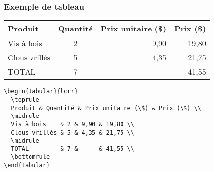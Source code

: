 \begin{frame}[fragile=singleslide]
  \frametitle{Exemple de tableau}

  \begin{center}
    \begin{tabular}{lcrr}
      \toprule
      Produit & Quantité & Prix unitaire (\$) & Prix (\$) \\
      \midrule
      Vis à bois    & 2 & 9,90 & 19,80 \\
      Clous vrillés & 5 & 4,35 & 21,75 \\
      \midrule
      TOTAL         & 7 &      & 41,55 \\
      \bottomrule
    \end{tabular}
  \end{center}

\begin{lstlisting}
\begin{tabular}{lcrr}
  \toprule
  Produit & Quantité & Prix unitaire (\$) & Prix (\$) \\
  \midrule
  Vis à bois    & 2 & 9,90 & 19,80 \\
  Clous vrillés & 5 & 4,35 & 21,75 \\
  \midrule
  TOTAL         & 7 &      & 41,55 \\
  \bottomrule
\end{tabular}
\end{lstlisting}
\end{frame}

